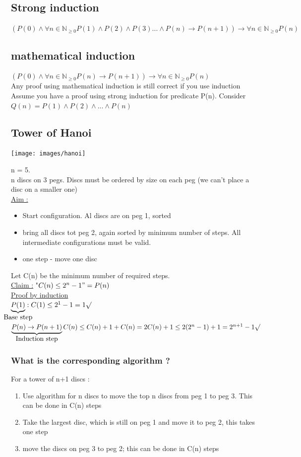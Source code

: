 \documentclass[12pt,a4paper]{article}
\begin{document}
\subsection{Strong induction}
$(P(0) \wedge \forall n \in \mathbb{N}_{\geq 0} P(1) \wedge P(2) \wedge P(3)...\wedge P(n) \to P(n+1)) \to \forall n \in \mathbb{N}_{\geq 0} P(n)$
\subsection{mathematical induction}
 $(P(0) \wedge \forall n \in \mathbb{N}_{\geq 0} P(n) \to P(n+1)) \to \forall n \in \mathbb{N}_{\geq 0} P(n)$\\
 Any proof using mathematical induction is still correct if you use induction\\
Assume you have a proof using strong induction for predicate P(n). Consider $Q(n) = P(1) \wedge P(2) \wedge...\wedge P(n)$
\subsection{Tower of Hanoi}
\begin{center}
\texttt{[image: images/hanoi]}
\end{center}
n = 5.\\
n discs on 3 pegs. Discs must be ordered by size on each peg (we can't place a disc on a smaller one)\\
\underline{Aim :} \begin{itemize}
\item Start configuration. Al discs are on  peg 1, sorted
\item bring all discs tot peg 2, again sorted by minimum number of steps. All intermediate configurations must be valid.
\item one step - move one disc
\end{itemize} 
Let C(n) be the minimum number of required steps.\\
\underline{Claim :} "$C(n) \leq 2^n-1" = P(n)$\\
\underline{Proof by induction}\\
 $\underbrace{P(1)}_{\mathclap{\mbox{Base step}}} : C(1) \leq 2^1-1=1 \surd$\\
$\underbrace{P(n) \to P(n+1)}_{\mathclap{\mbox{Induction step}}}\\
C(n) \leq C(n) +1+C(n) = 2C(n) +1 \leq 2(2^n-1)+1 = 2^{n+1}-1\surd$\\
\subsubsection{What is the corresponding algorithm ?}
For a tower of n+1 discs :
\begin{enumerate}
\item Use algorithm for n discs to move the top n discs from peg 1 to peg 3. This can be done in C(n) steps
\item Take the largest disc, which is still on peg 1 and move it to peg 2, this takes one step
\item move the discs on peg 3 to peg 2; this can be done in C(n) steps
\end{enumerate}
\end{document}

